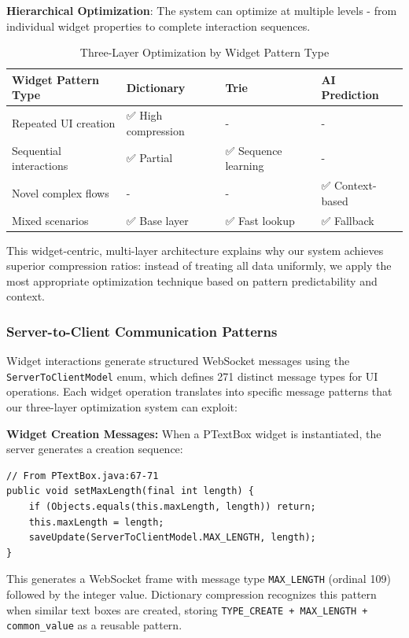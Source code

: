 \documentclass[12pt,a4paper]{article}
\begin{document}
\textbf{Hierarchical Optimization}: The system can optimize at multiple levels - from individual widget properties to complete interaction sequences.

\begin{table}[H]
\centering
\begin{tabular}{|l|l|l|l|}
\hline
\textbf{Widget Pattern Type} & \textbf{Dictionary} & \textbf{Trie} & \textbf{AI Prediction} \\
\hline
Repeated UI creation & ✅ High compression & - & - \\
Sequential interactions & ✅ Partial & ✅ Sequence learning & - \\
Novel complex flows & - & - & ✅ Context-based \\
Mixed scenarios & ✅ Base layer & ✅ Fast lookup & ✅ Fallback \\
\hline
\end{tabular}
\caption{Three-Layer Optimization by Widget Pattern Type}
\label{tab:widget-optimization}
\end{table}

This widget-centric, multi-layer architecture explains why our system achieves superior compression ratios: instead of treating all data uniformly, we apply the most appropriate optimization technique based on pattern predictability and context.

\subsubsection{Server-to-Client Communication Patterns}

Widget interactions generate structured WebSocket messages using the \texttt{ServerToClientModel} enum, which defines 271 distinct message types for UI operations. Each widget operation translates into specific message patterns that our three-layer optimization system can exploit:

\textbf{Widget Creation Messages:}
When a PTextBox widget is instantiated, the server generates a creation sequence:

\begin{lstlisting}[caption=PTextBox Server-to-Client Message Generation]
// From PTextBox.java:67-71
public void setMaxLength(final int length) {
    if (Objects.equals(this.maxLength, length)) return;
    this.maxLength = length;
    saveUpdate(ServerToClientModel.MAX_LENGTH, length);
}
\end{lstlisting}

This generates a WebSocket frame with message type \texttt{MAX\_LENGTH} (ordinal 109) followed by the integer value. Dictionary compression recognizes this pattern when similar text boxes are created, storing \texttt{TYPE\_CREATE + MAX\_LENGTH + common\_value} as a reusable pattern.
\end{document}
